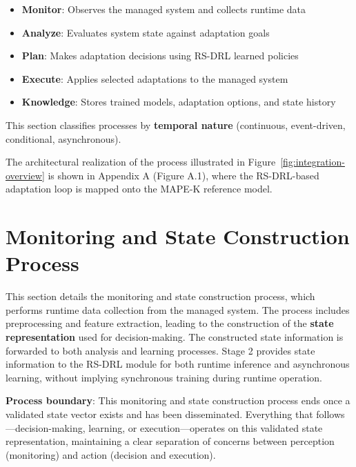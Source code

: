 \documentclass[11pt,a4paper]{article}
\begin{document}
\begin{itemize}
    \item \textbf{Monitor}: Observes the managed system and collects runtime data
    \item \textbf{Analyze}: Evaluates system state against adaptation goals
    \item \textbf{Plan}: Makes adaptation decisions using RS-DRL learned policies
    \item \textbf{Execute}: Applies selected adaptations to the managed system
    \item \textbf{Knowledge}: Stores trained models, adaptation options, and state history
\end{itemize}

This section classifies processes by \textbf{temporal nature} (continuous, event-driven, conditional, asynchronous).

The architectural realization of the process illustrated in Figure~\ref{fig:integration-overview} is shown in Appendix A (Figure A.1), where the RS-DRL-based adaptation loop is mapped onto the MAPE-K reference model.


\section{Monitoring and State Construction Process}
\label{sec:monitoring}

This section details the monitoring and state construction process, which performs runtime data collection from the managed system. The process includes preprocessing and feature extraction, leading to the construction of the \textbf{state representation} used for decision-making. The constructed state information is forwarded to both analysis and learning processes. Stage 2 provides state information to the RS-DRL module for both runtime inference and asynchronous learning, without implying synchronous training during runtime operation.

\textbf{Process boundary}: This monitoring and state construction process ends once a validated state vector exists and has been disseminated. Everything that follows---decision-making, learning, or execution---operates on this validated state representation, maintaining a clear separation of concerns between perception (monitoring) and action (decision and execution).
\end{document}
